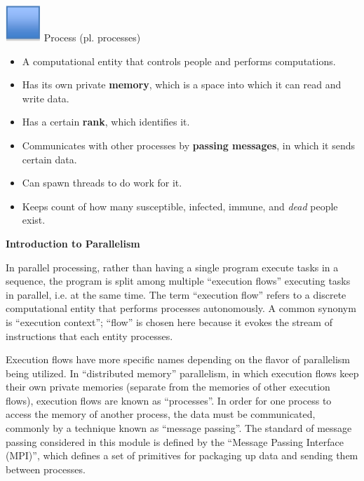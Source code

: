 \documentclass[letterpaper,10pt,openany,oneside]{sphinxmanual}
\begin{document}
\includegraphics{img-5.png} Process (pl. processes)
\begin{itemize}
\item {} 
A computational entity that controls people and performs computations.

\item {} 
Has its own private \textbf{memory}, which is a space into which it can read and write data.

\item {} 
Has a certain \textbf{rank}, which identifies it.

\item {} 
Communicates with other processes by \textbf{passing messages}, in which it sends certain data.

\item {} 
Can spawn threads to do work for it.

\item {} 
Keeps count of how many susceptible, infected, immune, and \emph{dead} people exist.

\end{itemize}

\textbf{Introduction to Parallelism}

In parallel processing, rather than having a single program execute
tasks in a sequence, the program is split among multiple “execution
flows” executing tasks in parallel, i.e. at the same time. The term
“execution flow” refers to a discrete computational entity that performs
processes autonomously. A common synonym is “execution context”; “flow”
is chosen here because it evokes the stream of instructions that each
entity processes.

Execution flows have more specific names depending on the flavor of
parallelism being utilized. In “distributed memory” parallelism, in
which execution flows keep their own private memories (separate from the
memories of other execution flows), execution flows are known as
“processes”. In order for one process to access the memory of another
process, the data must be communicated, commonly by a technique known as
“message passing”. The standard of message passing considered in this
module is defined by the “Message Passing Interface (MPI)”, which
defines a set of primitives for packaging up data and sending them
between processes.
\end{document}
